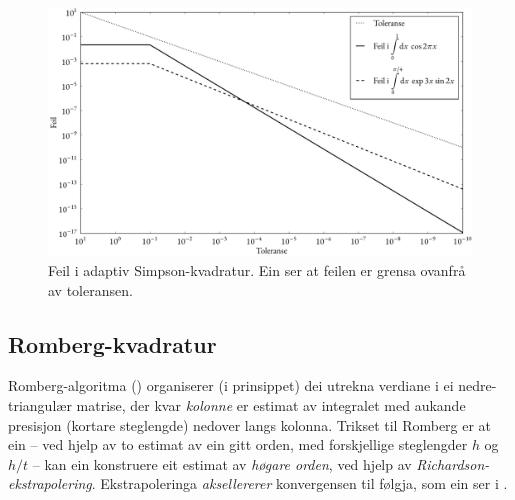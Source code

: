 \documentclass[12pt]{article}
\begin{document}
\begin{multicols}{2}
    \begin{figure}[H]
        \centering
        \includegraphics[width=\columnwidth]{simp_err}
        \caption{Feil i adaptiv Simpson-kvadratur.
        Ein ser at feilen er grensa ovanfrå av toleransen.}
        \label{fig:simp_err}
    \end{figure}


    \subsection{Romberg-kvadratur}
    Romberg-algoritma () organiserer (i prinsippet) dei utrekna verdiane
    i ei nedre-triangulær matrise, der kvar {\em kolonne} er estimat av integralet
    med aukande presisjon (kortare steglengde) nedover langs kolonna.
    Trikset til Romberg er at ein -- ved hjelp av to estimat av ein gitt orden,
    med forskjellige steglengder $h$ og $h/t$ -- kan ein konstruere eit estimat
    av {\em høgare orden}, ved hjelp av {\em Richardson-ekstrapolering}.
    Ekstrapoleringa {\em aksellererer} konvergensen til følgja,
    som ein ser i .


\end{multicols}
\end{document}
